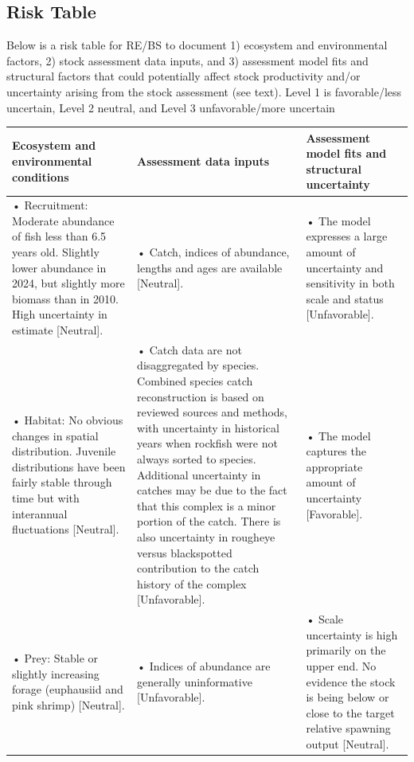 \documentclass[
]{scrartcl}
\begin{document}
\newpage{}

\subsection{Risk Table}\label{risk-table-1}

Below is a risk table for RE/BS to document 1) ecosystem and
environmental factors, 2) stock assessment data inputs, and 3)
assessment model fits and structural factors that could potentially
affect stock productivity and/or uncertainty arising from the stock
assessment (see text). Level 1 is favorable/less uncertain, Level 2
neutral, and Level 3 unfavorable/more uncertain

\begingroup
\fontsize{9.0pt}{10.8pt}\selectfont
\begin{longtable*}{>{\raggedright\arraybackslash}p{\dimexpr 150.00pt -2\arrayrulewidth}>{\raggedright\arraybackslash}p{\dimexpr 150.00pt -2\arrayrulewidth}>{\raggedright\arraybackslash}p{\dimexpr 150.00pt -2\arrayrulewidth}}
\toprule
Ecosystem and environmental conditions & Assessment data inputs & Assessment model fits and structural uncertainty \\ 
\midrule\addlinespace[2.5pt]
• Recruitment: Moderate abundance of fish less than 6.5 years old. Slightly lower abundance in 2024, but slightly more biomass than in 2010. High uncertainty in estimate [Neutral]. & • Catch, indices of abundance, lengths and ages are available [Neutral]. & • The model expresses a large amount of uncertainty and sensitivity in both scale and status [Unfavorable]. \\ 
• Habitat: No obvious changes in spatial distribution. Juvenile distributions have been fairly stable through time but with interannual fluctuations [Neutral]. & • Catch data are not disaggregated by species. Combined species catch reconstruction is based on reviewed sources and methods, with uncertainty in historical years when rockfish were not always sorted to species. Additional uncertainty in catches may be due to the fact that this complex is a minor portion of the catch. There is also uncertainty in rougheye versus blackspotted contribution to the catch history of the complex [Unfavorable]. & • The model captures the appropriate amount of uncertainty [Favorable]. \\ 
• Prey: Stable or slightly increasing forage (euphausiid and pink shrimp) [Neutral]. & • Indices of abundance are generally uninformative [Unfavorable]. & • Scale uncertainty is high primarily on the upper end. No evidence the stock is being below or close to the target relative spawning output [Neutral]. \\ 

\end{longtable*}
\end{document}
